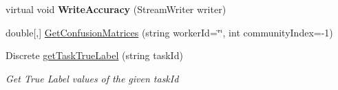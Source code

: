 \begin{DoxyCompactItemize}
\item 
\hypertarget{class_crowdsourcing_models_1_1_results_a5671a2613a1ac145ea46714be55fe6f9}{}virtual void {\bfseries Write\+Accuracy} (Stream\+Writer writer)\label{class_crowdsourcing_models_1_1_results_a5671a2613a1ac145ea46714be55fe6f9}

\item 
double\mbox{[},\mbox{]} \hyperlink{class_crowdsourcing_models_1_1_results_addf80aff1622db41d84d077d9aaddfbb}{Get\+Confusion\+Matrices} (string worker\+Id=\char`\"{}\char`\"{}, int community\+Index=-\/1)
\item 
Discrete \hyperlink{class_crowdsourcing_models_1_1_results_aa9600574fa6802c4a2703ecc1e27d73a}{get\+Task\+True\+Label} (string task\+Id)
\begin{DoxyCompactList}\small\item\em Get True Label values of the given task\+Id \end{DoxyCompactList}\end{DoxyCompactItemize}
